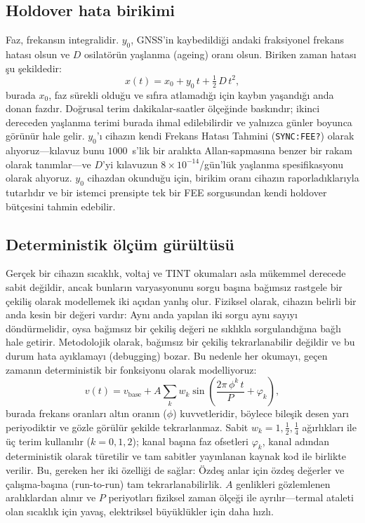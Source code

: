 \documentclass[9pt,twocolumn,a4paper]{extarticle}
\begin{document}
\subsection{Holdover hata birikimi}
Faz, frekansın integralidir. $y_0$, GNSS'in kaybedildiği andaki fraksiyonel frekans hatası olsun ve $D$ osilatörün yaşlanma (ageing) oranı olsun. Biriken zaman hatası şu şekildedir:
\begin{equation}
x(t) = x_0 + y_0\,t + \tfrac{1}{2}\,D\,t^{2},
\label{eq:holdover}
\end{equation}
burada $x_0$, faz sürekli olduğu ve sıfıra atlamadığı için kaybın yaşandığı anda donan fazdır. Doğrusal terim dakikalar-saatler ölçeğinde baskındır; ikinci dereceden yaşlanma terimi burada ihmal edilebilirdir ve yalnızca günler boyunca görünür hale gelir. $y_0$'ı cihazın kendi Frekans Hatası Tahmini (\texttt{SYNC:FEE?}) olarak alıyoruz---kılavuz bunu $1000$~s'lik bir aralıkta Allan-sapmasına benzer bir rakam olarak tanımlar---ve $D$'yi kılavuzun $8\times10^{-14}$/gün'lük yaşlanma spesifikasyonu olarak alıyoruz. $y_0$ cihazdan okunduğu için, birikim oranı cihazın raporladıklarıyla tutarlıdır ve bir istemci prensipte tek bir FEE sorgusundan kendi holdover bütçesini tahmin edebilir.

\subsection{Deterministik ölçüm gürültüsü}
Gerçek bir cihazın sıcaklık, voltaj ve TINT okumaları asla mükemmel derecede sabit değildir, ancak bunların varyasyonunu sorgu başına bağımsız rastgele bir çekiliş olarak modellemek iki açıdan yanlış olur. Fiziksel olarak, cihazın belirli bir anda kesin bir değeri vardır: Aynı anda yapılan iki sorgu aynı sayıyı döndürmelidir, oysa bağımsız bir çekiliş değeri ne sıklıkla sorgulandığına bağlı hale getirir. Metodolojik olarak, bağımsız bir çekiliş tekrarlanabilir değildir ve bu durum hata ayıklamayı (debugging) bozar. Bu nedenle her okumayı, geçen zamanın deterministik bir fonksiyonu olarak modelliyoruz:
\begin{equation}
v(t) = v_{\mathrm{base}} + A \sum_{k} w_k
       \sin\!\left(\frac{2\pi\,\phi^{k}\,t}{P} + \varphi_k\right),
\label{eq:noise}
\end{equation}
burada frekans oranları altın oranın ($\phi$) kuvvetleridir, böylece bileşik desen yarı periyodiktir ve gözle görülür şekilde tekrarlanmaz. Sabit $w_k=1,\tfrac12,\tfrac14$ ağırlıkları ile üç terim kullanılır ($k=0,1,2$); kanal başına faz ofsetleri $\varphi_k$, kanal adından deterministik olarak türetilir ve tam sabitler yayınlanan kaynak kod ile birlikte verilir. Bu, gereken her iki özelliği de sağlar: Özdeş anlar için özdeş değerler ve çalışma-başına (run-to-run) tam tekrarlanabilirlik. $A$ genlikleri gözlemlenen aralıklardan alınır ve $P$ periyotları fiziksel zaman ölçeği ile ayrılır---termal ataleti olan sıcaklık için yavaş, elektriksel büyüklükler için daha hızlı.
\end{document}
